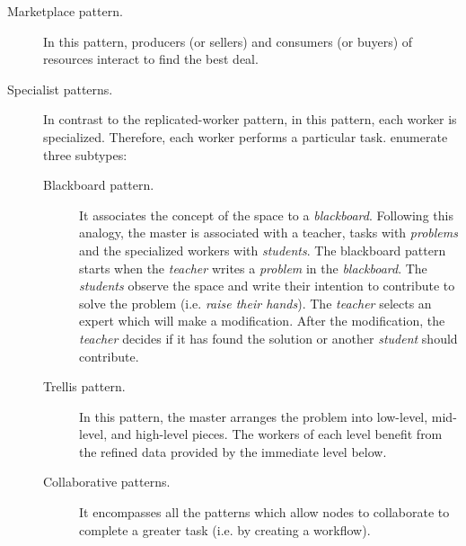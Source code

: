 \begin{description}
\begin{enumerate*}[label=\itshape(\arabic*\upshape)]
			  \end{enumerate*}
  \item[Marketplace pattern.] In this pattern, producers (or sellers) and consumers (or buyers) of resources interact to find the best deal. %
  \item[Specialist patterns.] In contrast to the replicated-worker pattern, in this pattern, each worker is specialized.
                              Therefore, each worker performs a particular task.
                              \citeauthor{freeman_javaspaces_1999} enumerate three subtypes:
			      \begin{description}
				  \item[Blackboard pattern.]
					It associates the concept of the space to a \emph{blackboard}.
					Following this analogy, the master is associated with a teacher, tasks with \emph{problems} and the specialized workers with \emph{students}.
					The blackboard pattern starts when the \emph{teacher} writes a \emph{problem} in the \emph{blackboard}.
					The \emph{students} observe the space and write their intention to contribute to solve the problem (i.e. \emph{raise their hands}).
					The \emph{teacher} selects an expert which will make a modification.
					After the modification, the \emph{teacher} decides if it has found the solution or another \emph{student} should contribute.
				  \item [Trellis pattern.]
					In this pattern, the master arranges the problem into low-level, mid-level, and high-level pieces.
					The workers of each level benefit from the refined data provided by the immediate level below.
				  \item [Collaborative patterns.]
					It encompasses all the patterns which allow nodes to collaborate to complete a greater task (i.e. by creating a workflow).
			      \end{description}
\end{description}


